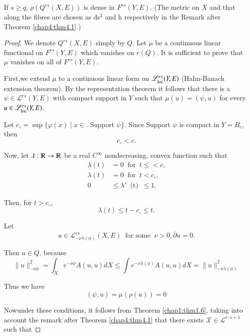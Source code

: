 \begin{theorem}\label{chap4:thm4.4}%
  If $s \geq q$, $\rho (Q^{rs} (X,E))$ is dense in
  $F^{rs}(Y,E)$. (The metric on $X$ and that along the fibres are chosen as
  ds$^2$ and h respectively in the Remark after Theorem \ref{chap4:thm4.1}.) 
\end{theorem}

\begin{proof}
  We denote $Q^{rs}(X,E)$ simply by $Q$. Let $\mu$ be a continuous
  linear functional on $F^{rs} (Y,E)$ which vanishes on $r(Q)$. It is
  sufficient to prove that $\mu$ vanishes on all of $F^{rs}(Y,E)$.  
  
  First,\pageoriginale we extend $\mu$ to a continuous linear form on $
  \mathscr{L}^{rs}_{\operatorname{loc}}(Y,E)$ (Hahn-Banach extension theorem). By the
  representation theorem it follows that there is a $\psi \in
  \mathscr{L}^{rs} (Y,E)$ with compact support in $Y$ such that $\mu (u)
  = (\psi , u)$ for every $ u \in \mathscr{L}^{rs}_{\operatorname{loc}}(Y,E)$. 

  Let $c_\circ = \sup \{ \varphi (x) \mid x \in$. Support $\psi\}$.
  Since Support $\psi$ is compact in $Y = B_c$, then 
  $$ 
  c_\circ < c.
  $$

Now, let $\lambda : \varmathbb{R} \rightarrow \varmathbb{R}$ be a real
$C^\infty$ nondecreasing, convex function such that 
\begin{align*} 
  \lambda (t) & = 0 ~\text { for }~ t \leq < c_\circ\\
  \lambda (t) & = 0 ~\text { for }~ t< c_\circ,\\
  0 & \leq \lambda' ~\text { (t) }~ \leq 1.
\end{align*}

Then, for $t > c_\circ$,
$$
\lambda (t) \leq t-c_\circ \leq t .
$$

Let  
$$  
u \in \mathscr{L}^{rs}_{-\nu \lambda (\phi)} (X,E) ~\text{ for some }~ \nu
> 0, \overline{\partial} u =0 . 
$$

Then $u \in Q$, because
$$
\| u \|^2 _{-\nu \phi} = \int_X e^{-\nu \phi} A(u ,u ) dX \leq
\int e^{-\nu \lambda (\phi) } A (u,u) dX = \| u\| ^2 _{-\nu \lambda
  (\phi)}
$$ 

Thus we have   
$$ 
(\psi , u) = \mu (\rho (u)) =0 
$$

Now\pageoriginale under these conditions, it follows from Theorem
\ref{chap1:thm1.6}, 
taking into account the remark after Theorem \ref{chap4:thm4.1} that there exists
$\mathcal{X} \in \mathscr{L}^{r, s+1}$ such that  


\end{proof}
